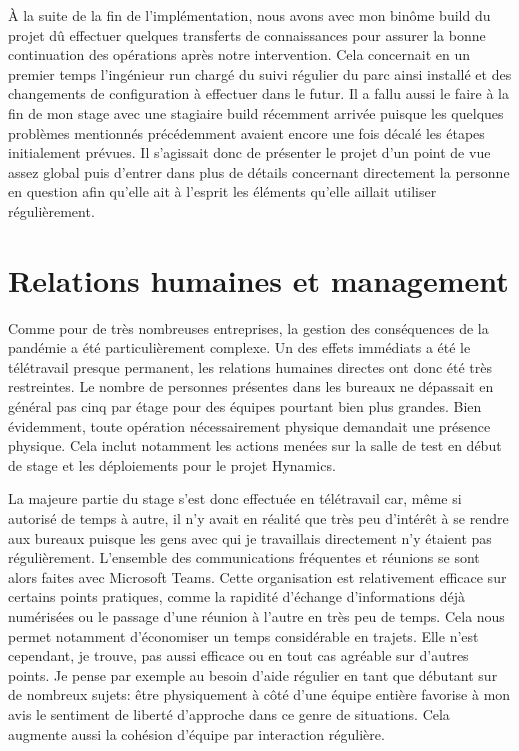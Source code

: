 \documentclass[12pt, oneside, a4paper, titlepage]{report}
\begin{document}
À la suite de la fin de l'implémentation, nous avons avec mon binôme \gls{build}
du projet dû effectuer quelques transferts de connaissances pour assurer la
bonne continuation des opérations après notre intervention. Cela concernait en
un premier temps l'ingénieur \gls{run} chargé du suivi régulier du parc ainsi
installé et des changements de configuration à effectuer dans le futur. Il a
fallu aussi le faire à la fin de mon stage avec une stagiaire \gls{build}
récemment arrivée puisque les quelques problèmes mentionnés précédemment avaient
encore une fois décalé les étapes initialement prévues. Il s'agissait donc de
présenter le projet d'un point de vue assez global puis d'entrer dans plus de
détails concernant directement la personne en question afin qu'elle ait à
l'esprit les éléments qu'elle aillait utiliser régulièrement.


\section{Relations humaines et management}%
\label{sec:mission::rhm}

Comme pour de très nombreuses entreprises, la gestion des conséquences de la
pandémie a été particulièrement complexe. Un des effets immédiats a été le
télétravail presque permanent, les relations humaines directes ont donc été très
restreintes. Le nombre de personnes présentes dans les bureaux ne dépassait en
général pas cinq par étage pour des équipes pourtant bien plus grandes. Bien
évidemment, toute opération nécessairement physique demandait une présence
physique. Cela inclut notamment les actions menées sur la salle de test en début
de stage et les déploiements pour le projet Hynamics.

La majeure partie du stage s'est donc effectuée en télétravail car, même si
autorisé de temps à autre, il n'y avait en réalité que très peu d'intérêt à se
rendre aux bureaux puisque les gens avec qui je travaillais directement n'y
étaient pas régulièrement. L'ensemble des communications fréquentes et réunions
se sont alors faites avec Microsoft Teams. Cette organisation est relativement
efficace sur certains points pratiques, comme la rapidité d'échange
d'informations déjà numérisées ou le passage d'une réunion à l'autre en très peu
de temps. Cela nous permet notamment d'économiser un temps considérable en
trajets. Elle n'est cependant, je trouve, pas aussi efficace ou en tout cas
agréable sur d'autres points. Je pense par exemple au besoin d'aide régulier en
tant que débutant sur de nombreux sujets: être physiquement à côté d'une équipe
entière favorise à mon avis le sentiment de liberté d'approche dans ce genre de
situations. Cela augmente aussi la cohésion d'équipe par interaction régulière.
\end{document}

